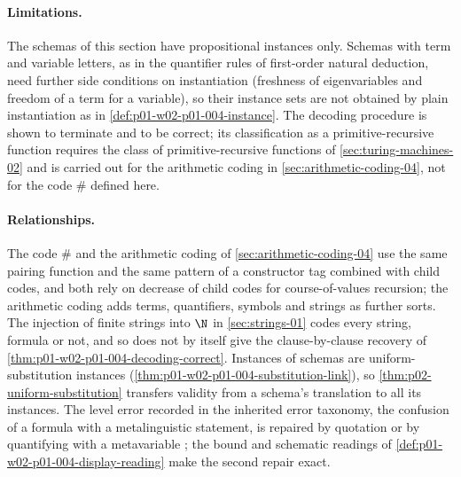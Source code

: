 \paragraph{Limitations.} The schemas of this section have propositional
instances only. Schemas with term and variable letters, as in the quantifier
rules of first-order natural deduction, need further side conditions on
instantiation (freshness of eigenvariables and freedom of a term for a
variable), so their instance sets are not obtained by plain instantiation as
in \cref{def:p01-w02-p01-004-instance}. The decoding procedure is shown to
terminate and to be correct; its classification as a primitive-recursive
function requires the class of primitive-recursive functions of
\cref{sec:turing-machines-02} and is carried out for the arithmetic coding in \cref{sec:arithmetic-coding-04}, not for the code
\(\#\) defined here.

\paragraph{Relationships.} The code \(\#\) and the arithmetic coding of
\cref{sec:arithmetic-coding-04} use the same pairing function and the same
pattern of a constructor tag combined with child codes, and both rely on
decrease of child codes for course-of-values recursion; the arithmetic coding
adds terms, quantifiers, symbols and strings as further sorts. The injection
of finite strings into \(\N\) in \cref{sec:strings-01} codes every string,
formula or not, and so does not by itself give the clause-by-clause recovery
of \cref{thm:p01-w02-p01-004-decoding-correct}. Instances of schemas are
uniform-substitution instances
(\cref{thm:p01-w02-p01-004-substitution-link}), so
\cref{thm:p02-uniform-substitution} transfers validity from a schema's
translation to all its instances. The level error recorded in the inherited
error taxonomy, the confusion of a formula with a metalinguistic statement,
is repaired by quotation or by quantifying with a metavariable
\cite[ch.~``Writing Formal Definitions and Proofs'', section ``Error
taxonomy'']{FrozenFormalLogicSchemasCodes}; the bound and schematic readings
of \cref{def:p01-w02-p01-004-display-reading} make the second repair exact.
